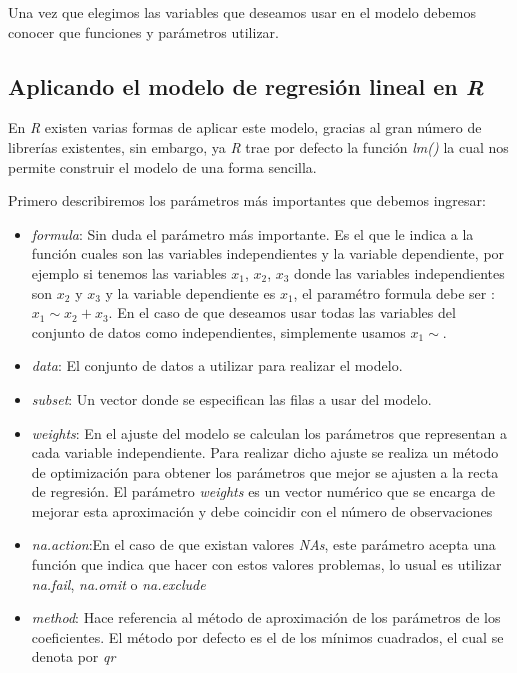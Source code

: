\documentclass[12pt,]{krantz}
\begin{document}
Una vez que elegimos las variables que deseamos usar en el modelo debemos conocer que funciones y parámetros utilizar.

\hypertarget{aplicando-el-modelo-de-regresion-lineal-en-r}{%
\subsection{\texorpdfstring{Aplicando el modelo de regresión lineal en \emph{R}}{Aplicando el modelo de regresión lineal en R}}\label{aplicando-el-modelo-de-regresion-lineal-en-r}}

En \emph{R} existen varias formas de aplicar este modelo, gracias al gran número de librerías existentes, sin embargo, ya \emph{R} trae por defecto la función \emph{lm()} la cual nos permite construir el modelo de una forma sencilla.

Primero describiremos los parámetros más importantes que debemos ingresar:

\begin{itemize}
\item
  \emph{formula}: Sin duda el parámetro más importante. Es el que le indica a la función cuales son las variables independientes y la variable dependiente, por ejemplo si tenemos las variables \(x_1\), \(x_2\), \(x_3\) donde las variables independientes son \(x_2\) y \(x_3\) y la variable dependiente es \(x_1\), el paramétro formula debe ser : \(x_1 \sim x_2 + x_3\). En el caso de que deseamos usar todas las variables del conjunto de datos como independientes, simplemente usamos \(x_1 \sim .\)
\item
  \emph{data}: El conjunto de datos a utilizar para realizar el modelo.
\item
  \emph{subset}: Un vector donde se especifican las filas a usar del modelo.
\item
  \emph{weights}: En el ajuste del modelo se calculan los parámetros que representan a cada variable independiente. Para realizar dicho ajuste se realiza un método de optimización para obtener los parámetros que mejor se ajusten a la recta de regresión. El parámetro \emph{weights} es un vector numérico que se encarga de mejorar esta aproximación y debe coincidir con el número de observaciones
\item
  \emph{na.action}:En el caso de que existan valores \emph{NAs}, este parámetro acepta una función que indica que hacer con estos valores problemas, lo usual es utilizar \emph{na.fail}, \emph{na.omit} o \emph{na.exclude}
\item
  \emph{method}: Hace referencia al método de aproximación de los parámetros de los coeficientes. El método por defecto es el de los mínimos cuadrados, el cual se denota por \emph{qr}
\end{itemize}
\end{document}
